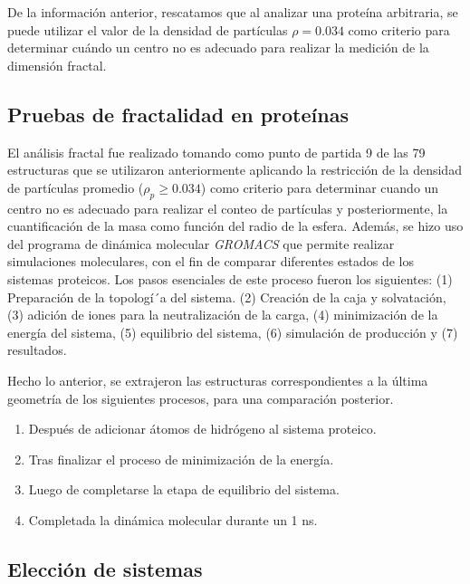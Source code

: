  	De la informaci\'{o}n anterior, rescatamos que al analizar una prote\'{i}na arbitraria, se puede utilizar el valor de la densidad de part\'{i}culas $\rho = 0.034$ como criterio para determinar cu\'{a}ndo un centro no es adecuado para realizar la medici\'{o}n de la dimensi\'{o}n fractal. 
 	
 	
	\subsection{Pruebas de fractalidad en prote\'{i}nas}
	\label{sec:pfp}
 	
 	
 	El an\'{a}lisis fractal fue realizado tomando como punto de partida 9 de las 79 estructuras que se utilizaron anteriormente aplicando la restricci\'{o}n de la densidad de part\'{i}culas  promedio ($\rho_{p} \geq 0.034$) como criterio para determinar cuando un centro no es adecuado para realizar el conteo de part\'{i}culas y posteriormente, la cuantificaci\'{o}n de la masa como funci\'{o}n del radio de la esfera. Adem\'{a}s, se hizo uso del programa de din\'{a}mica molecular \textit{GROMACS}\cite{Lemkul2024, Abraham2015} que permite realizar simulaciones moleculares, con el fin de comparar diferentes estados de los sistemas proteicos. Los pasos esenciales de este proceso fueron los siguientes: (1) Preparaci\'{o}n de la topolog\'{i´}a del sistema. (2) Creaci\'{o}n de la caja y solvataci\'{o}n, (3) adici\'{o}n de iones para la neutralizaci\'{o}n de la carga, (4) minimizaci\'{o}n de la energ\'{i}a del sistema, (5) equilibrio del sistema, (6) simulaci\'{o}n de producci\'{o}n y (7) resultados.
 	
 	
 	
 	Hecho lo anterior, se extrajeron las estructuras correspondientes a la \'{u}ltima 
 	geometr\'{i}a de los siguientes procesos, para una comparaci\'{o}n posterior.
 	
 	\begin{enumerate}
 		\item Despu\'{e}s de adicionar \'{a}tomos de hidr\'{o}geno al sistema proteico. 
 		\item Tras finalizar el proceso de minimizaci\'{o}n de la energ\'{i}a.
 		\item Luego de completarse la etapa de equilibrio del sistema.
 		\item Completada la din\'{a}mica molecular durante un 1 ns.
 	\end{enumerate}
 	
 	
 	\subsection{Elecci\'{o}n de sistemas}
 	
